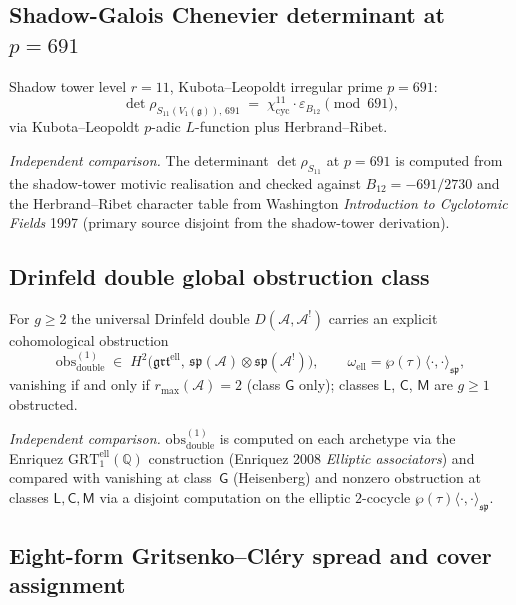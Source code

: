 \subsection{Shadow-Galois Chenevier determinant at \texorpdfstring{\(p=691\)}{p=691}}
\label{v4-subsec:shadow-galois-chenevier-691}

Shadow tower level \(r=11\), Kubota--Leopoldt irregular prime \(p=691\):
\[
\det\rho_{S_{11}(V_1(\mathfrak g)),\,691}
 \;=\; \chi_{\mathrm{cyc}}^{11}\cdot\varepsilon_{B_{12}} \pmod{691},
\]
via Kubota--Leopoldt \(p\)-adic \(L\)-function plus Herbrand--Ribet.

\noindent\emph{Independent comparison.} The determinant
\(\det\rho_{S_{11}}\) at \(p=691\) is computed from the shadow-tower
motivic realisation and checked against \(B_{12}=-691/2730\) and the
Herbrand--Ribet
character table from Washington \textit{Introduction to Cyclotomic
Fields} 1997 (primary source disjoint from the
shadow-tower derivation).

\subsection{Drinfeld double global obstruction class}
\label{v4-subsec:drinfeld-double-obstruction}

For \(g \ge 2\) the universal Drinfeld double \(D(\mathcal{A}, \mathcal{A}^!)\) carries
an explicit cohomological obstruction
\[
 \mathrm{obs}^{(1)}_{\mathrm{double}}
 \;\in\; H^2\bigl(\mathfrak{grt}^{\mathrm{ell}},\,
 \mathfrak{sp}(\mathcal{A})\otimes\mathfrak{sp}(\mathcal{A}^!)\bigr),
 \qquad \omega_{\mathrm{ell}} = \wp(\tau)\langle\cdot,\cdot\rangle_{\mathfrak{sp}},
\]
vanishing if and only if \(r_{\max}(\mathcal{A})=2\) (class \(\mathsf G\) only);
classes \(\mathsf L\), \(\mathsf C\), \(\mathsf M\) are \(g \ge 1\) obstructed.

\noindent\emph{Independent comparison.}
\(\mathrm{obs}^{(1)}_{\mathrm{double}}\) is computed on each archetype via the
Enriquez \(\mathrm{GRT}_1^{\mathrm{ell}}(\mathbb{Q})\) construction (Enriquez
2008 \textit{Elliptic associators}) and compared with vanishing at class~\(\mathsf G\) (Heisenberg)
and nonzero obstruction at classes \(\mathsf L,\mathsf C,\mathsf M\)
via a disjoint computation on the elliptic \(2\)-cocycle
\(\wp(\tau)\langle\cdot,\cdot\rangle_{\mathfrak{sp}}\).

\subsection{Eight-form Gritsenko--Cl\'ery spread and cover assignment}
\label{v4-subsec:eight-form-cover-assignment}

